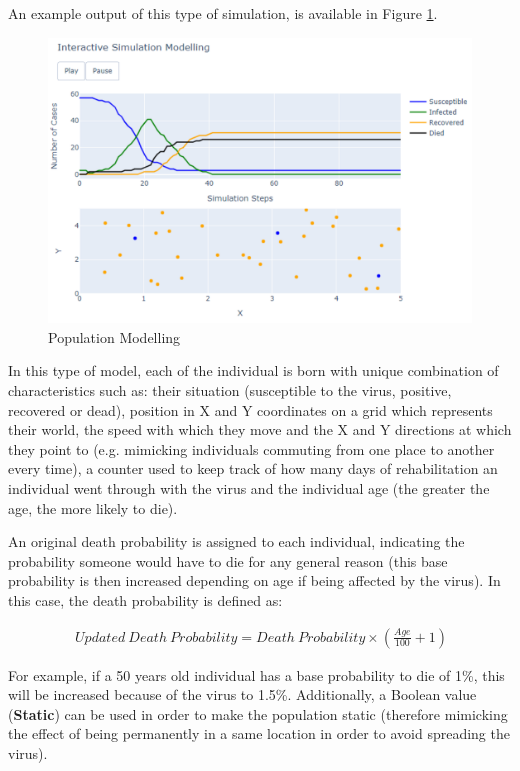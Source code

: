 An example output of this type of simulation, is available in Figure \ref{pop}.

\begin{figure}[ht!]%
    \centering
    \includegraphics[width=0.85\linewidth]{latex/images/pop.pdf}
    \caption{Population Modelling}
    \label{pop}
\end{figure}

In this type of model, each of the individual is born with unique combination of characteristics such as: their situation (susceptible to the virus, positive, recovered or dead), position in X and Y coordinates on a grid which represents their world, the speed with which they move and the X and Y directions at which they point to (e.g. mimicking individuals commuting from one place to another every time), a counter used to keep track of how many days of rehabilitation an individual went through with the virus and the individual age (the greater the age, the more likely to die). 

An original death probability is assigned to each individual, indicating the probability someone would have to die for any general reason (this base probability is then increased depending on age if being affected by the virus). In this case, the death probability is defined as:

\useshortskip
\begin{align}
\ Updated\:Death\:Probability = Death\:Probability \times (\frac{Age}{100} + 1) 
\end{align}
\useshortskip

For example, if a 50 years old individual has a base probability to die of 1\%, this will be increased because of the virus to 1.5\%. Additionally, a Boolean value (\textbf{Static}) can be used in order to make the population static (therefore mimicking the effect of being permanently in a same location in order to avoid spreading the virus).

